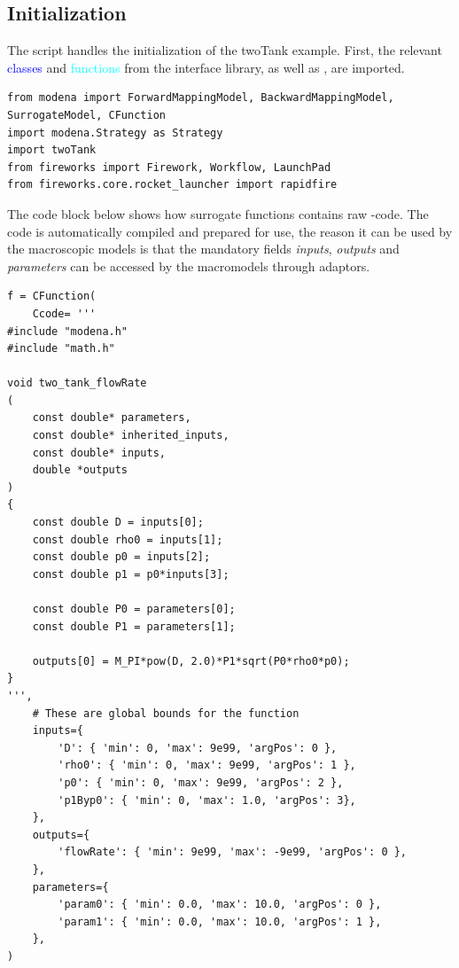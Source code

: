 \subsection{Initialization}
    \label{subsec:initialization}
%
The {\initModels} script handles the initialization of the twoTank example.
First, the relevant \textcolor{blue}{classes} and \textcolor{cyan}{functions} from the {\MoDeNa} interface library, as well as {\FireWorks}, are imported. 
%
%
\begin{lstlisting}[style=lstPython, firstnumber=42]
from modena import ForwardMappingModel, BackwardMappingModel, SurrogateModel, CFunction
import modena.Strategy as Strategy
import twoTank
from fireworks import Firework, Workflow, LaunchPad
from fireworks.core.rocket_launcher import rapidfire
\end{lstlisting}
%
%
\par
%
The code block below shows how surrogate functions contains raw {\Clang}-code. 
The code is automatically compiled and prepared for use, the reason it can be used by the macroscopic models is that the mandatory fields \emph{inputs}, \emph{outputs} and \emph{parameters} can be accessed by the macromodels through adaptors. 
%
\begin{lstlisting}[style=lstPython, firstnumber=49]
f = CFunction(
    Ccode= '''
#include "modena.h"
#include "math.h"

void two_tank_flowRate
(
    const double* parameters,
    const double* inherited_inputs,
    const double* inputs,
    double *outputs
)
{
    const double D = inputs[0];
    const double rho0 = inputs[1];
    const double p0 = inputs[2];
    const double p1 = p0*inputs[3];

    const double P0 = parameters[0];
    const double P1 = parameters[1];

    outputs[0] = M_PI*pow(D, 2.0)*P1*sqrt(P0*rho0*p0);
}
''',
    # These are global bounds for the function
    inputs={
        'D': { 'min': 0, 'max': 9e99, 'argPos': 0 },
        'rho0': { 'min': 0, 'max': 9e99, 'argPos': 1 },
        'p0': { 'min': 0, 'max': 9e99, 'argPos': 2 },
        'p1Byp0': { 'min': 0, 'max': 1.0, 'argPos': 3},
    },
    outputs={
        'flowRate': { 'min': 9e99, 'max': -9e99, 'argPos': 0 },
    },
    parameters={
        'param0': { 'min': 0.0, 'max': 10.0, 'argPos': 0 },
        'param1': { 'min': 0.0, 'max': 10.0, 'argPos': 1 },
    },
)
\end{lstlisting}
